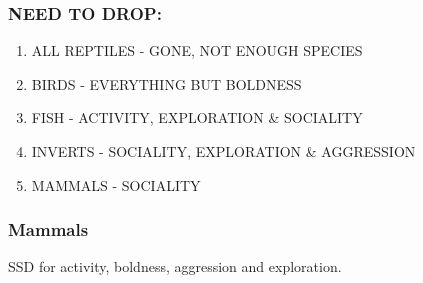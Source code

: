 \documentclass[]{article}
\providecommand{\tightlist}{%
  \setlength{\itemsep}{0pt}\setlength{\parskip}{0pt}}
\begin{document}
\subsubsection{NEED TO DROP:}\label{need-to-drop}

\begin{enumerate}
\def\labelenumi{\arabic{enumi}.}
\tightlist
\item
  ALL REPTILES - GONE, NOT ENOUGH SPECIES
\item
  BIRDS - EVERYTHING BUT BOLDNESS
\item
  FISH - ACTIVITY, EXPLORATION \& SOCIALITY
\item
  INVERTS - SOCIALITY, EXPLORATION \& AGGRESSION
\item
  MAMMALS - SOCIALITY
\end{enumerate}

\subsubsection{Mammals}\label{mammals}

SSD for activity, boldness, aggression and exploration.
\end{document}
